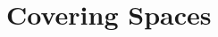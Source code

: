 \documentclass[../Moduli_Spaces_of_Riemann_Surfaces.tex]{subfiles}
\begin{document}
    \section{Covering Spaces}
\end{document}
